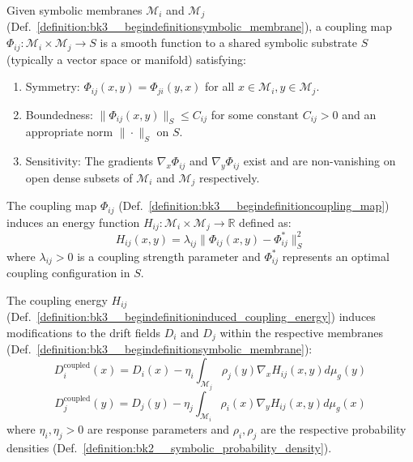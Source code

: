 \begin{definition} \label{definition:bk3__begindefinitioncoupling_map}
Given symbolic membranes $\mathcal{M}_i$ and $\mathcal{M}_j$ (Def.~\ref{definition:bk3__begindefinitionsymbolic_membrane}), a coupling map $\Phi_{ij}: \mathcal{M}_i \times \mathcal{M}_j \rightarrow S$ is a smooth function to a shared symbolic substrate $S$ (typically a vector space or manifold) satisfying:
\begin{enumerate}
    \item Symmetry: $\Phi_{ij}(x,y) = \Phi_{ji}(y,x)$ for all $x \in \mathcal{M}_i, y \in \mathcal{M}_j$.
    \item Boundedness: $\|\Phi_{ij}(x,y)\|_S \leq C_{ij}$ for some constant $C_{ij} > 0$ and an appropriate norm $\|\cdot\|_S$ on $S$.
    \item Sensitivity: The gradients $\nabla_x\Phi_{ij}$ and $\nabla_y\Phi_{ij}$ exist and are non-vanishing on open dense subsets of $\mathcal{M}_i$ and $\mathcal{M}_j$ respectively.
\end{enumerate}
\end{definition}

\begin{definition} \label{definition:bk3__begindefinitioninduced_coupling_energy}
The coupling map $\Phi_{ij}$ (Def.~\ref{definition:bk3__begindefinitioncoupling_map}) induces an energy function $H_{ij}: \mathcal{M}_i \times \mathcal{M}_j \rightarrow \mathbb{R}$ defined as:
\[
H_{ij}(x,y) = \lambda_{ij} \|\Phi_{ij}(x,y) - \Phi_{ij}^*\|_S^2
\]
where $\lambda_{ij} > 0$ is a coupling strength parameter and $\Phi_{ij}^*$ represents an optimal coupling configuration in $S$.
\end{definition}

\begin{theorem} \label{theorem:bk3__begintheoremcoupling_induced_drift_modi}
The coupling energy $H_{ij}$ (Def.~\ref{definition:bk3__begindefinitioninduced_coupling_energy}) induces modifications to the drift fields $D_i$ and $D_j$ within the respective membranes (Def.~\ref{definition:bk3__begindefinitionsymbolic_membrane}):
\[
D_i^{\text{coupled}}(x) = D_i(x) - \eta_i \int_{\mathcal{M}_j} \rho_j(y)\nabla_x H_{ij}(x,y)d\mu_g(y)
\]
\[
D_j^{\text{coupled}}(y) = D_j(y) - \eta_j \int_{\mathcal{M}_i} \rho_i(x)\nabla_y H_{ij}(x,y)d\mu_g(x)
\]
where $\eta_i, \eta_j > 0$ are response parameters and $\rho_i, \rho_j$ are the respective probability densities (Def.~\ref{definition:bk2__symbolic_probability_density}).
\end{theorem}

